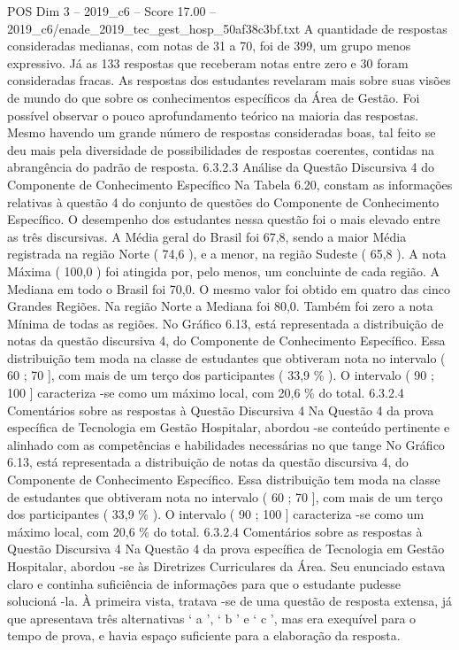 \begin{textsample}{POS Dim 3 – 2019\_c6 – Score 17.00 – 2019\_c6/enade\_2019\_tec\_gest\_hosp\_50af38c3bf.txt}
A quantidade de respostas consideradas medianas, com notas de 31 a 70, foi de 399, um grupo menos expressivo.
Já as 133 respostas que receberam notas entre zero e 30 foram consideradas fracas.
As respostas dos estudantes revelaram mais sobre suas visões de mundo do que sobre os conhecimentos específicos da Área de Gestão.
Foi possível observar o pouco aprofundamento teórico na maioria das respostas.
Mesmo havendo um grande número de respostas consideradas boas, tal feito se deu mais pela diversidade de possibilidades de respostas coerentes, contidas na abrangência do padrão de resposta. 6.3.2.3 Análise da Questão Discursiva 4 do Componente de Conhecimento Específico Na Tabela 6.20, constam as informações relativas à questão 4 do conjunto de questões do Componente de Conhecimento Específico.
O desempenho dos estudantes nessa questão foi o mais elevado entre as três discursivas.
A Média geral do Brasil foi 67,8, sendo a maior Média registrada na região Norte ( 74,6 ), e a menor, na região Sudeste ( 65,8 ).
A nota Máxima ( 100,0 ) foi atingida por, pelo menos, um concluinte de cada região.
A Mediana em todo o Brasil foi 70,0.
O mesmo valor foi obtido em quatro das cinco Grandes Regiões.
Na região Norte a Mediana foi 80,0.
Também foi zero a nota Mínima de todas as regiões.
No Gráfico 6.13, está representada a distribuição de notas da questão discursiva 4, do Componente de Conhecimento Específico.
Essa distribuição tem moda na classe de estudantes que obtiveram nota no intervalo ( 60 ; 70 ], com mais de um terço dos participantes ( 33,9 \% ).
O intervalo ( 90 ; 100 ] caracteriza -se como um máximo local, com 20,6 \% do total. 6.3.2.4 Comentários sobre as respostas à Questão Discursiva 4 Na Questão 4 da prova específica de Tecnologia em Gestão Hospitalar, abordou -se conteúdo pertinente e alinhado com as competências e habilidades necessárias no que tange No Gráfico 6.13, está representada a distribuição de notas da questão discursiva 4, do Componente de Conhecimento Específico.
Essa distribuição tem moda na classe de estudantes que obtiveram nota no intervalo ( 60 ; 70 ], com mais de um terço dos participantes ( 33,9 \% ).
O intervalo ( 90 ; 100 ] caracteriza -se como um máximo local, com 20,6 \% do total. 6.3.2.4 Comentários sobre as respostas à Questão Discursiva 4 Na Questão 4 da prova específica de Tecnologia em Gestão Hospitalar, abordou -se às Diretrizes Curriculares da Área.
Seu enunciado estava claro e continha suficiência de informações para que o estudante pudesse solucioná -la.
À primeira vista, tratava -se de uma questão de resposta extensa, já que apresentava três alternativas ‘ a ’, ‘ b ’ e ‘ c ’, mas era exequível para o tempo de prova, e havia espaço suficiente para a elaboração da resposta.

\end{textsample}
